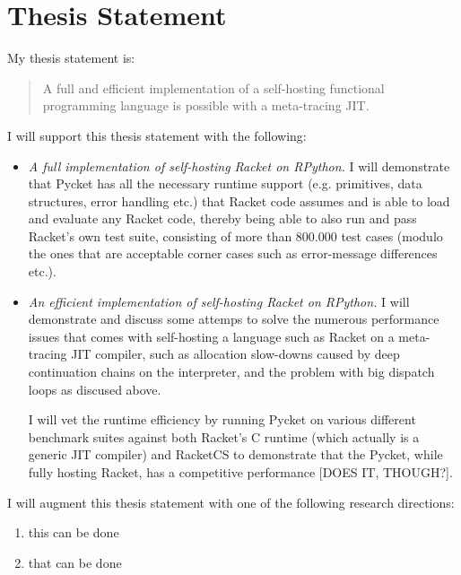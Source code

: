 \section{Thesis Statement}

My thesis statement is:

\begin{quote}
  A full and efficient implementation of a self-hosting functional
  programming language is possible with a meta-tracing JIT.
\end{quote}

I will support this thesis statement with the following:

\begin{itemize}
  \item \textit{A full implementation of self-hosting Racket on
    RPython.} I will demonstrate that Pycket has all the necessary
    runtime support (e.g. primitives, data structures, error handling
    etc.)  that Racket code assumes and is able to load and evaluate
    any Racket code, thereby being able to also run and pass Racket's
    own test suite, consisting of more than 800.000 test cases (modulo
    the ones that are acceptable corner cases such as error-message
    differences etc.).
  \item \textit{An efficient implementation of self-hosting Racket on
    RPython.} I will demonstrate and discuss some attemps to solve the
    numerous performance issues that comes with self-hosting a
    language such as Racket on a meta-tracing JIT compiler, such as
    allocation slow-downs caused by deep continuation chains on the
    interpreter, and the problem with big dispatch loops as discused
    above.


    I will vet the runtime efficiency by running Pycket on various
    different benchmark suites against both Racket's C runtime (which
    actually is a generic JIT compiler) and RacketCS to demonstrate
    that the Pycket, while fully hosting Racket, has a competitive
    performance [DOES IT, THOUGH?].
\end{itemize}

I will augment this thesis statement with one of the following research directions:

\begin{enumerate}
  \item this can be done
  \item that can be done
\end{enumerate}
